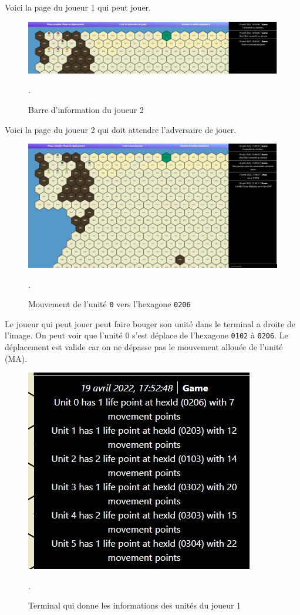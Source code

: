 Voici la page du joueur 1 qui peut jouer.\\

\begin{figure}[H]
\centering
\includegraphics[scale=0.35]{data/joueur 2.jpg}
\caption{Barre d'information du joueur 2}.
\end{figure}

Voici la page du joueur 2 qui doit attendre l'adversaire de jouer.

\begin{figure}[H]
\centering
\includegraphics[scale=0.35]{data/move unit player 1.jpg}
\caption{Mouvement de l'unité \lstinline{0} vers l'hexagone \lstinline{0206}}.
\end{figure}

Le joueur qui peut jouer peut faire bouger son unité dans le terminal a droite de l'image.
On peut voir que l'unité 0 s'est déplace de l'hexagone \lstinline{0102} à \lstinline{0206}. Le déplacement est valide car on ne dépasse pas le mouvement allouée de l'unité (MA).\\

\begin{figure}[H]
\centering
\includegraphics[scale=0.6]{data/info units.jpg}
\caption{Terminal qui donne les informations des unités du joueur 1 }.
\end{figure}

